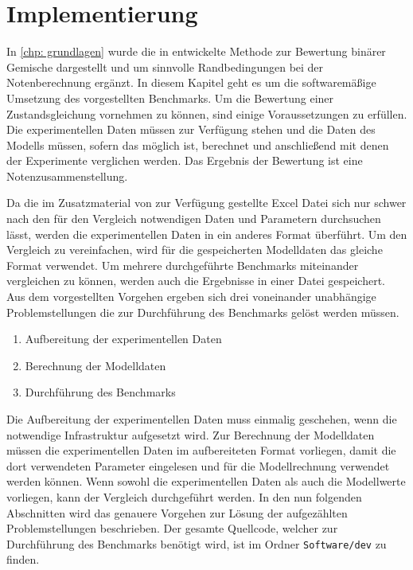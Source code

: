 \documentclass[../thesis.tex]{subfiles}
\begin{document}
\chapter{Implementierung}
\label{chp: implementierung}
In \autoref{chp: grundlagen} wurde die in \cite{jaubert2020benchmark} entwickelte Methode zur Bewertung binärer Gemische dargestellt und um sinnvolle Randbedingungen bei der Notenberechnung ergänzt. In diesem Kapitel geht es um die softwaremäßige Umsetzung des vorgestellten Benchmarks.
Um die Bewertung einer Zustandsgleichung vornehmen zu können, sind einige Voraussetzungen zu erfüllen. Die experimentellen Daten müssen zur Verfügung stehen und die Daten des Modells müssen, sofern das möglich ist, berechnet und anschließend mit denen der Experimente verglichen werden. Das Ergebnis der Bewertung ist eine Notenzusammenstellung.

Da die im Zusatzmaterial von \cite{jaubert2020benchmark} zur Verfügung gestellte Excel Datei sich nur schwer nach den für den Vergleich notwendigen Daten und Parametern durchsuchen lässt, werden die experimentellen Daten in ein anderes Format überführt. Um den Vergleich zu vereinfachen, wird für die gespeicherten Modelldaten das gleiche Format verwendet. Um mehrere durchgeführte Benchmarks miteinander vergleichen zu können, werden auch die Ergebnisse in einer Datei gespeichert. Aus dem vorgestellten Vorgehen ergeben sich drei voneinander unabhängige Problemstellungen die zur Durchführung des Benchmarks gelöst werden müssen.

\begin{enumerate}
	\item Aufbereitung der experimentellen Daten
	\item Berechnung der Modelldaten
	\item Durchführung des Benchmarks
\end{enumerate}

Die Aufbereitung der experimentellen Daten muss einmalig geschehen, wenn die notwendige Infrastruktur aufgesetzt wird. Zur Berechnung der Modelldaten müssen die experimentellen Daten im aufbereiteten Format vorliegen, damit die dort verwendeten Parameter eingelesen und für die Modellrechnung verwendet werden können. Wenn sowohl die experimentellen Daten als auch die Modellwerte vorliegen, kann der Vergleich durchgeführt werden. In den nun folgenden Abschnitten wird das genauere Vorgehen zur Lösung der aufgezählten Problemstellungen beschrieben. Der gesamte Quellcode, welcher zur Durchführung des Benchmarks benötigt wird, ist im Ordner \texttt{Software/dev} zu finden. 
\end{document}
